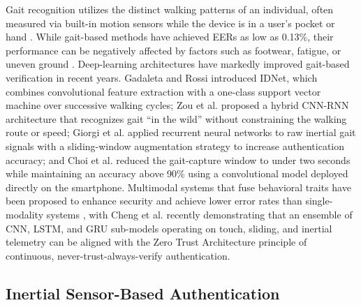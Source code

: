 \documentclass[3p,times,procedia]{elsarticle}
\begin{document}
Gait recognition utilizes
the distinct walking patterns of an individual, often measured
via built-in motion sensors while the device is in a user's
pocket or hand \cite{muaaz_smartphone-based_2017}. While gait-based methods have
achieved EERs as low as 0.13\%, their performance can be
negatively affected by factors such as footwear, fatigue, or
uneven ground \cite{stylios_behavioral_2021}. Deep-learning
architectures have markedly improved gait-based verification in
recent years. Gadaleta and Rossi \cite{gadaleta_idnet_2018}
introduced IDNet, which combines convolutional feature
extraction with a one-class support vector machine over
successive walking cycles; Zou et al. \cite{zou_deep_2020}
proposed a hybrid CNN-RNN architecture that recognizes gait
``in the wild'' without constraining the walking route or
speed; Giorgi et al. \cite{giorgi_using_2021} applied recurrent
neural networks to raw inertial gait signals with a
sliding-window augmentation strategy to increase authentication
accuracy; and Choi et al. \cite{choi_smartphone_2023} reduced
the gait-capture window to under two seconds while maintaining
an accuracy above 90\% using a convolutional model deployed
directly on the smartphone. Multimodal systems that fuse
behavioral traits have been proposed to enhance security and
achieve lower error rates than single-modality systems
\cite{saevanee_continuous_2015,cheng_continuous_2026}, with
Cheng et al. \cite{cheng_continuous_2026} recently demonstrating
that an ensemble of CNN, LSTM, and GRU sub-models operating on
touch, sliding, and inertial telemetry can be aligned with the
Zero Trust Architecture principle of continuous,
never-trust-always-verify authentication.

\subsection{Inertial Sensor-Based Authentication}
\end{document}
